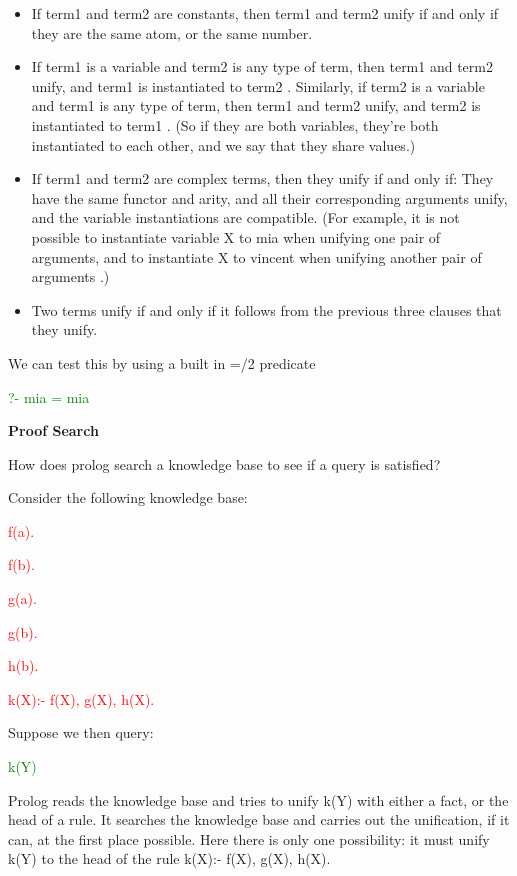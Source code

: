\documentclass{article}
\begin{document}
\begin{itemize}
   \item If term1 and term2 are constants, then term1 and term2 unify if and only if they are the same atom, or the same number.
   \item If term1 is a variable and term2 is any type of term, then term1 and term2 unify, and term1 is instantiated to term2 . Similarly, if term2 is a variable and term1 is any type of term, then term1 and term2 unify, and term2 is instantiated to term1 . (So if they are both variables, they’re both instantiated to each other, and we say that they share values.)
    \item If term1 and term2 are complex terms, then they unify if and only if:
        They have the same functor and arity, and
        all their corresponding arguments unify, and
        the variable instantiations are compatible. (For example, it is not possible to instantiate variable X to mia when unifying one pair of arguments, and to instantiate X to vincent when unifying another pair of arguments .)
   \item Two terms unify if and only if it follows from the previous three clauses that they unify.
\end{itemize}

We can test this by using a built in =/2 predicate

\textcolor{green}{?- mia = mia}


\textbf{Proof Search}

How does prolog search a knowledge base to see if a query is satisfied?

Consider the following knowledge base:

\textcolor{red}{f(a).}

\textcolor{red}{f(b).}

\textcolor{red}{g(a).}

\textcolor{red}{g(b).}

\textcolor{red}{h(b).}

\textcolor{red}{k(X):- f(X), g(X), h(X).}

Suppose we then query:

\textcolor{green}{k(Y)}

Prolog reads the knowledge base and tries to unify k(Y) with either a fact, or the head of a rule. It searches the knowledge base and carries out the unification, if it can, at the first place possible. Here there is only one possibility: it must unify k(Y) to the head of the rule k(X):- f(X), g(X), h(X).
\end{document}
